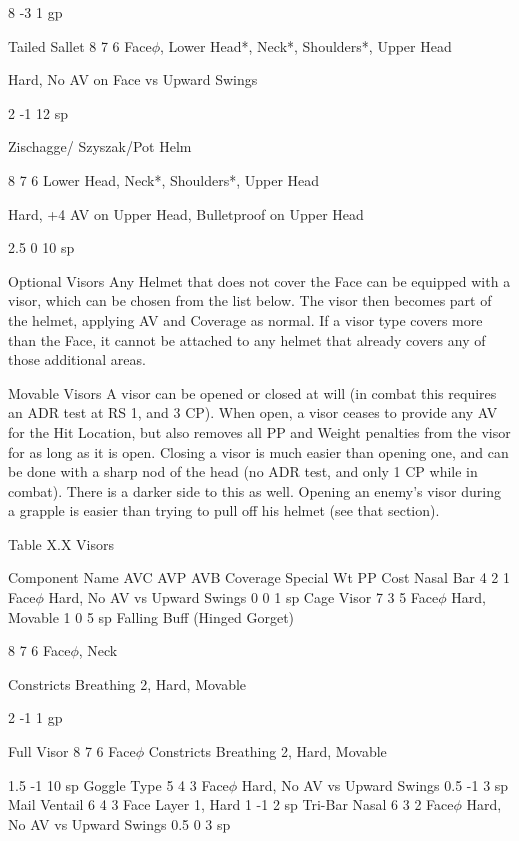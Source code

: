 \documentclass[oneside,11pt,english]{book}
\begin{document}
8 -3 1 gp 

Tailed Sallet 8 7 6 Face$\phi$, Lower Head*, 
Neck*, Shoulders*, 
Upper Head 

Hard, No AV on Face vs Upward 
Swings 

2 -1 12 
sp 

Zischagge/ 
Szyszak/Pot 
Helm 

 

 

 

8 7 6 Lower Head, Neck*, 
Shoulders*, Upper 
Head 

Hard, +4 AV on Upper Head, 
Bulletproof on Upper Head 

2.5 0 10 
sp 

 
Optional Visors 
Any Helmet that does not cover the Face can be equipped with a visor, which can be chosen from the list 
below. The visor then becomes part of the helmet, applying AV and Coverage as normal. If a visor type 
covers more than the Face, it cannot be attached to any helmet that already covers any of those additional 
areas. 

 

Movable Visors 
A visor can be opened or closed at will (in combat this requires an ADR test at RS 1, and 3 CP). When 
open, a visor ceases to provide any AV for the Hit Location, but also removes all PP and Weight penalties 
from the visor for as long as it is open. Closing a visor is much easier than opening one, and can be done 
with a sharp nod of the head (no ADR test, and only 1 CP while in combat). There is a darker side to this 
as well. Opening an enemy’s visor during a grapple is easier than trying to pull off his helmet (see that 
section). 

 

Table X.X Visors 


Component Name AVC AVP AVB Coverage Special Wt PP Cost 
Nasal Bar 4 2 1 Face$\phi$ Hard, No AV vs Upward Swings 0 0 1 sp 
Cage Visor 7 3 5 Face$\phi$ Hard, Movable 1 0 5 sp 
Falling Buff (Hinged 
Gorget) 

8 7 6 Face$\phi$, 
Neck 

Constricts Breathing 2, Hard, 
Movable 

2 -1 1 gp 

Full Visor 8 7 6 Face$\phi$ Constricts Breathing 2, Hard, 
Movable 

1.5 -1 10 
sp 
Goggle Type 5 4 3 Face$\phi$ Hard, No AV vs Upward Swings 0.5 -1 3 sp 
Mail Ventail 6 4 3 Face Layer 1, Hard 1 -1 2 sp 
Tri-Bar Nasal 6 3 2 Face$\phi$ Hard, No AV vs Upward Swings 0.5 0 3 sp 
\end{document}
